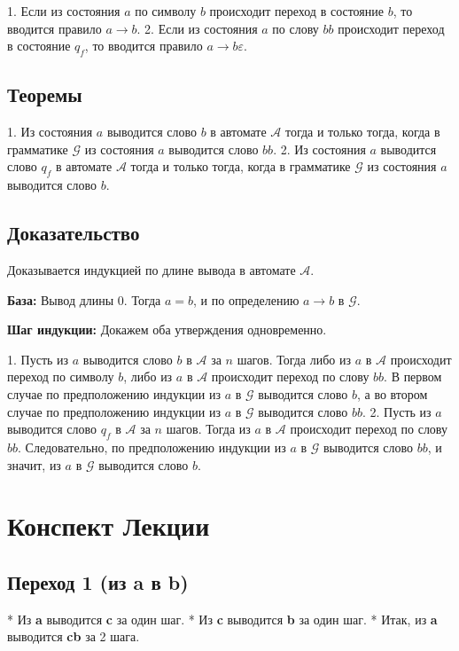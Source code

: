 \documentclass{article}
\begin{document}
\begin{itemize}
\begin{itemize}
1. Если из состояния $a$ по символу $b$ происходит переход в состояние $b$, то вводится правило $a\rightarrow b$.
2. Если из состояния $a$ по слову $bb$ происходит переход в состояние $q_f$, то вводится правило $a\rightarrow b\varepsilon$.

\subsection{Теоремы}

1. Из состояния $a$ выводится слово $b$ в автомате $\mathcal{A}$ тогда и только тогда, когда в грамматике $\mathcal{G}$ из состояния $a$ выводится слово $bb$.
2. Из состояния $a$ выводится слово $q_f$ в автомате $\mathcal{A}$ тогда и только тогда, когда в грамматике $\mathcal{G}$ из состояния $a$ выводится слово $b$.

\subsection{Доказательство}

Доказывается индукцией по длине вывода в автомате $\mathcal{A}$.

\textbf{База:} Вывод длины $0$. Тогда $a=b$, и по определению $a\rightarrow b$ в $\mathcal{G}$.

\textbf{Шаг индукции:} Докажем оба утверждения одновременно.

1. Пусть из $a$ выводится слово $b$ в $\mathcal{A}$ за $n$ шагов. Тогда либо из $a$ в $\mathcal{A}$ происходит переход по символу $b$, либо из $a$ в $\mathcal{A}$ происходит переход по слову $bb$. В первом случае по предположению индукции из $a$ в $\mathcal{G}$ выводится слово $b$, а во втором случае по предположению индукции из $a$ в $\mathcal{G}$ выводится слово $bb$.
2. Пусть из $a$ выводится слово $q_f$ в $\mathcal{A}$ за $n$ шагов. Тогда из $a$ в $\mathcal{A}$ происходит переход по слову $bb$. Следовательно, по предположению индукции из $a$ в $\mathcal{G}$ выводится слово $bb$, и значит, из $a$ в $\mathcal{G}$ выводится слово $b$.
\section{Конспект Лекции}

\subsection{Переход 1 (из \textbf{a} в \textbf{b})}

* Из \textbf{a} выводится \textbf{c} за один шаг.
* Из \textbf{c} выводится \textbf{b} за один шаг.
* Итак, из \textbf{a} выводится \textbf{cb} за 2 шага.


\end{itemize}
\end{itemize}
\end{document}

